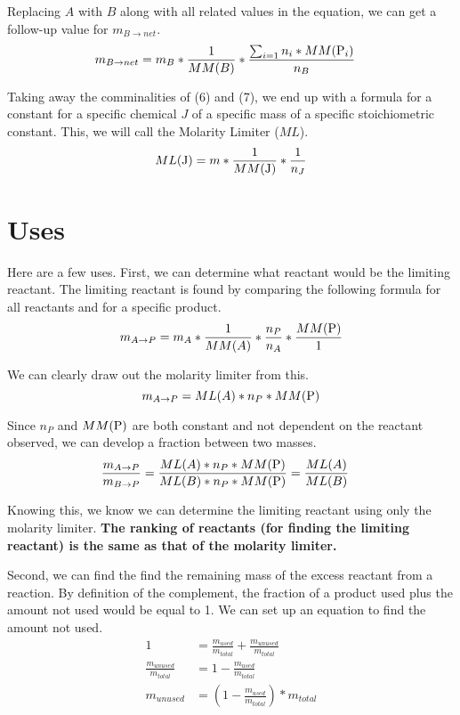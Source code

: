 \documentclass[11pt]{article}
\begin{document}
Replacing $A$ with $B$ along with all related values in the equation, we can get a follow-up value for $m_{B \to net}$.
\begin{align}
    m_{B \to net}  &=  m_B * \frac{1}{MM(B)} * \frac{\sum_{i = 1} n_i * MM(\ce{P_i})}{n_B}
\end{align}

Taking away the comminalities of (6) and (7), we end up with a formula for a constant for a specific chemical $J$ of a specific mass of a specific stoichiometric constant. 
This, we will call the Molarity Limiter ($ML$).
\begin{equation}
    ML(\ce{J}) = m * \frac{1}{MM(\ce{J})} * \frac{1}{n_J}
\end{equation}

\section{Uses}
Here are a few uses. 
First, we can determine what reactant would be the limiting reactant.
The limiting reactant is found by comparing the following formula for all reactants and for a specific product.
\begin{equation}
    m_{A \to P} =  m_A * \frac{1}{MM(A)} * \frac{n_P}{n_A} * \frac{MM(\ce{P})}{1}
\end{equation}

We can clearly draw out the molarity limiter from this.
\begin{equation}
    m_{A \to P} =  ML(A) * n_P * MM(\ce{P})
\end{equation}

Since $n_P$ and $MM(\ce{P})$ are both constant and not dependent on the reactant observed, we can develop a fraction between two masses.
\begin{align}
    \frac{m_{A \to P}}{m_{B \to P}} &=  \frac{ML(A) * n_P * MM(\ce{P})}{ML(B) * n_P * MM(\ce{P})}
        =   \frac{ML(A)}{ML(B)}
\end{align}

Knowing this, we know we can determine the limiting reactant using only the molarity limiter.
\textbf{The ranking of reactants (for finding the limiting reactant) is the same as that of the molarity limiter.}

Second, we can find the find the remaining mass of the excess reactant from a reaction.
By definition of the complement, the fraction of a product used plus the amount not used would be equal to 1.
We can set up an equation to find the amount not used.
\begin{align}
    1   &=  \frac{m_{used}}{m_{total}} + \frac{m_{unused}}{m_{total}}\\
    \frac{m_{unused}}{m_{total}}  &=  1 - \frac{m_{used}}{m_{total}}\\
    m_{unused}  &=  \left(1 - \frac{m_{used}}{m_{total}}\right) * m_{total}
\end{align}
\end{document}
